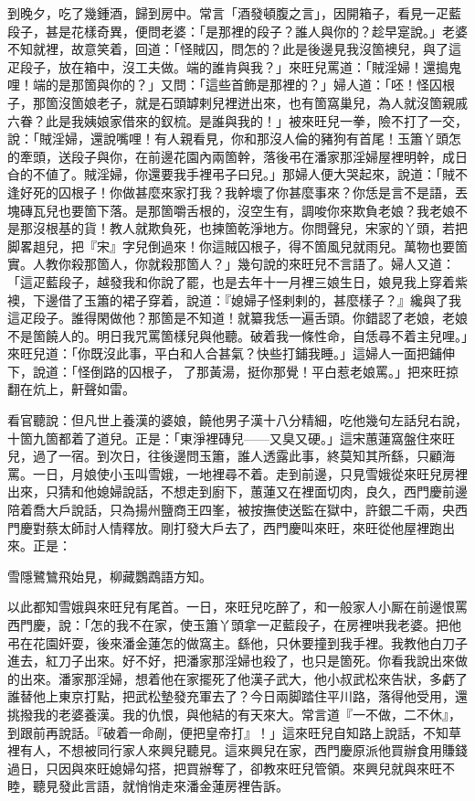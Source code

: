到晚夕，吃了幾鍾酒，歸到房中。常言「酒發頓腹之言」，因開箱子，看見一疋藍段子，甚是花樣奇異，便問老婆：「是那裡的段子？誰人與你的？趁早寔說。」老婆不知就裡，故意笑着，回道：「怪賊囚，問怎的？此是後邊見我沒箇襖兒，與了這疋段子，放在箱中，沒工夫做。端的誰肯與我？」來旺兒罵道：「賊淫婦！還搗鬼哩！端的是那箇與你的？」又問：「這些首飾是那裡的？」婦人道：「呸！怪囚根子，那箇沒箇娘老子，就是石頭罅剌兒裡迸出來，也有箇窩巢兒，為人就沒箇親戚六眷？此是我姨娘家借來的釵梳。是誰與我的！」被來旺兒一拳，險不打了一交，{}說：「賊淫婦，還說嘴哩！有人親看見，你和那沒人倫的豬狗有首尾！玉簫丫頭怎的牽頭，送段子與你，在前邊花園內兩箇幹，落後弔在潘家那淫婦屋裡明幹，成日㒲的不値了。賊淫婦，你還要我手裡弔子曰兒。」那婦人便大哭起來，說道：「賊不逢好死的囚根子！你做甚麼來家打我？我幹壞了你甚麼事來？你恁是言不是語，丟塊磚瓦兒也要箇下落。是那箇嚼舌根的，沒空生有，調唆你來欺負老娘？{}我老娘不是那沒根基的貨！教人就欺負死，也揀箇乾淨地方。你問聲兒，宋家的丫頭，若把脚畧趄兒，把『宋』字兒倒過來！你這賊囚根子，得不箇風兒就雨兒。萬物也要箇實。人教你殺那箇人，你就殺那箇人？」幾句說的來旺兒不言語了。婦人又道：「這疋藍段子，越發我和你說了罷，也是去年十一月裡三娘生日，娘見我上穿着紫襖，下邊借了玉簫的裙子穿着，說道：『媳婦子怪剌剌的，甚麼樣子？』纔與了我這疋段子。誰得閑做他？那箇是不知道！就纂我恁一遍舌頭。你錯認了老娘，老娘不是箇饒人的。明日我咒罵箇樣兒與他聽。破着我一條性命，自恁尋不着主兒哩。」{}來旺兒道：「你既沒此事，{}平白和人合甚氣？{}快些打鋪我睡。」這婦人一面把鋪伸下，說道：「怪倒路的囚根子，𠳹了那黃湯，挺你那覺！平白惹老娘罵。」把來旺掠翻在炕上，鼾聲如雷。

看官聽說：但凡世上養漢的婆娘，饒他男子漢十八分精細，吃他幾句左話兒右說，十箇九箇都着了道兒。正是：「東淨裡磚兒——又臭又硬。」這宋蕙蓮窩盤住來旺兒，過了一宿。到次日，往後邊問玉簫，誰人透露此事，終莫知其所繇，只顧海罵。一日，月娘使小玉叫雪娥，一地裡尋不着。走到前邊，只見雪娥從來旺兒房裡出來，只猜和他媳婦說話，不想走到廚下，蕙蓮又在裡面切肉，良久，西門慶前邊陪着喬大戶說話，只為揚州鹽商王四峯，被按撫使送監在獄中，許銀二千兩，央西門慶對蔡太師討人情釋放。剛打發大戶去了，西門慶叫來旺，來旺從他屋裡跑出來。正是：

\begin{myquote}
雪隱鷺鷥飛始見，柳藏鸚鵡語方知。
\end{myquote}

以此都知雪娥與來旺兒有尾首。一日，來旺兒吃醉了，和一般家人小厮在前邊恨罵西門慶，說：「怎的我不在家，使玉簫丫頭拿一疋藍段子，在房裡哄我老婆。把他弔在花園奸耍，後來潘金蓮怎的做窩主。繇他，只休要撞到我手裡。我教他白刀子進去，紅刀子出來。好不好，把潘家那淫婦也殺了，也只是箇死。你看我說出來做的出來。潘家那淫婦，想着他在家擺死了他漢子武大，他小叔武松來告狀，多虧了誰替他上東京打點，把武松墊發充軍去了？今日兩脚踏住平川路，落得他受用，還挑撥我的老婆養漢。我的仇恨，與他結的有天來大。常言道『一不做，二不休』，到跟前再說話。『破着一命剮，便把皇帝打』！」{}這來旺兒自知路上說話，不知草裡有人，不想被同行家人來興兒聽見。這來興兒在家，西門慶原派他買辦食用賺錢過日，只因與來旺媳婦勾搭，把買辦奪了，卻教來旺兒管領。來興兒就與來旺不睦，聽見發此言語，就悄悄走來潘金蓮房裡告訴。

